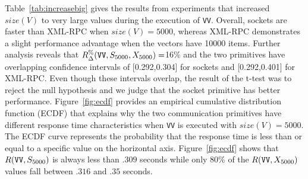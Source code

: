 \documentclass{sig-alternate}
\begin{document}





Table~\ref{tab:increasebig} gives the results from experiments that
increased $size(V)$ to very large values during the execution of
\texttt{VV}.  Overall, sockets are faster than XML-RPC when
$size(V)=5000$, whereas XML-RPC demonstrates a slight performance
advantage when the vectors have 10000 items.  Further analysis reveals
that {\small$R_\Delta^\%(\mbox{{\tt VV}},S_{5000},X_{5000})=$}16\% and
the two primitives have overlapping confidence intervals of
[0.292,0.304] for sockets and [0.292,0.401] for XML-RPC.  Even though
these intervals overlap, the result of the t-test was to reject the
null hypothesis and we judge that the socket primitive has better
performance.  Figure~\ref{fig:ecdf} provides an empirical cumulative
distribution function (ECDF) that explains why the two communication
primitives have different response time characteristics when {\tt VV}
is executed with $size(V)=5000$.  The ECDF curve represents the
probability that the response time is less than or equal to a specific
value on the horizontal axis.  Figure~\ref{fig:ecdf} shows that
$R(\mbox{{\tt VV}}, S_{5000})$ is always less than $.309$ seconds
while only $80\%$ of the $R(\mbox{{\tt VV}}, X_{5000})$ values fall
between $.316$ and $.35$ seconds.

\end{document}
